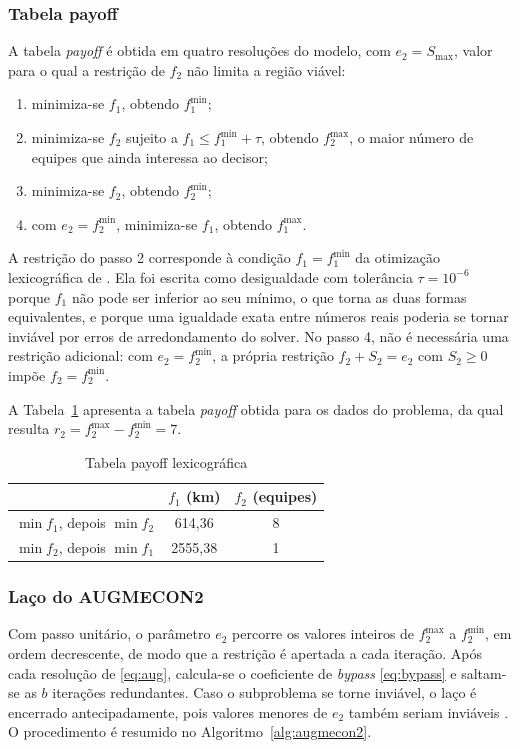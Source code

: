 \documentclass[conference]{IEEEtran}
\begin{document}
\subsubsection{Tabela payoff}
A tabela \textit{payoff} é obtida em quatro resoluções do modelo, com $e_2 = S_{\max}$, valor para o qual a restrição de $f_2$ não limita a região viável:
\begin{enumerate}
  \item minimiza-se $f_1$, obtendo $f_1^{\min}$;
  \item minimiza-se $f_2$ sujeito a $f_1 \le f_1^{\min} + \tau$, obtendo $f_2^{\max}$, o maior número de equipes que ainda interessa ao decisor;
  \item minimiza-se $f_2$, obtendo $f_2^{\min}$;
  \item com $e_2 = f_2^{\min}$, minimiza-se $f_1$, obtendo $f_1^{\max}$.
\end{enumerate}

A restrição do passo 2 corresponde à condição $f_1 = f_1^{\min}$ da otimização lexicográfica de \cite{mavrotas2009}. Ela foi escrita como desigualdade com tolerância $\tau = 10^{-6}$ porque $f_1$ não pode ser inferior ao seu mínimo, o que torna as duas formas equivalentes, e porque uma igualdade exata entre números reais poderia se tornar inviável por erros de arredondamento do solver. No passo 4, não é necessária uma restrição adicional: com $e_2 = f_2^{\min}$, a própria restrição $f_2 + S_2 = e_2$ com $S_2 \ge 0$ impõe $f_2 = f_2^{\min}$.

A Tabela~\ref{tab:payoff} apresenta a tabela \textit{payoff} obtida para os dados do problema, da qual resulta $r_2 = f_2^{\max} - f_2^{\min} = 7$.

\begin{table}[!t]
\renewcommand{\arraystretch}{1.2}
\caption{Tabela payoff lexicográfica}
\label{tab:payoff}
\centering
\begin{tabular}{lcc}
\hline
 & $f_1$ (km) & $f_2$ (equipes)\\
\hline
$\min f_1$, depois $\min f_2$ & 614,36 & 8\\
$\min f_2$, depois $\min f_1$ & 2555,38 & 1\\
\hline
\end{tabular}
\end{table}

\subsubsection{Laço do AUGMECON2}
Com passo unitário, o parâmetro $e_2$ percorre os valores inteiros de $f_2^{\max}$ a $f_2^{\min}$, em ordem decrescente, de modo que a restrição é apertada a cada iteração. Após cada resolução de \eqref{eq:aug}, calcula-se o coeficiente de \textit{bypass} \eqref{eq:bypass} e saltam-se as $b$ iterações redundantes. Caso o subproblema se torne inviável, o laço é encerrado antecipadamente, pois valores menores de $e_2$ também seriam inviáveis \cite{mavrotas2009}. O procedimento é resumido no Algoritmo~\ref{alg:augmecon2}.
\end{document}
